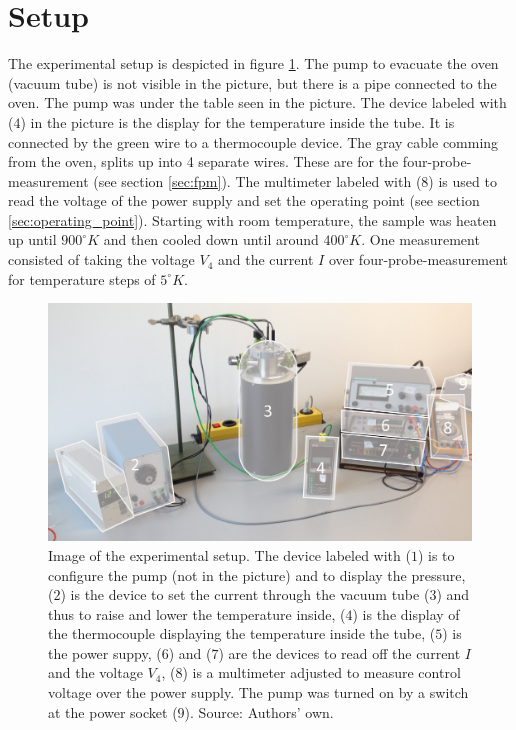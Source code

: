 \documentclass[a4paper]{article}
\begin{document}
\section{Setup}

The experimental setup is despicted in figure \ref{fig:setup}. The pump to evacuate the oven (vacuum tube) is not visible in the picture, but there is a pipe connected to the oven. The pump was under the table seen in the picture. The device labeled with ($4$) in the picture is the display for the temperature inside the tube. It is connected by the green wire to a thermocouple device. The gray cable comming from the oven, splits up into 4 separate wires. These are for the four-probe-measurement (see section \ref{sec:fpm}). The multimeter labeled with ($8$) is used to read the voltage of the power supply and set the operating point (see section \ref{sec:operating_point}). Starting with room temperature, the sample was heaten up until $900^{\circ}K$ and then cooled down until around $400^{\circ}K$. One measurement consisted of taking the voltage $V_4$ and the current $I$ over four-probe-measurement for temperature steps of $5^{\circ}K$.

\begin{figure}[H]
\captionsetup{singlelinecheck=off}
\centering
\includegraphics[width=1.0\textwidth]{img/setup.jpg}
\caption[blubb]{Image of the experimental setup. The device labeled with ($1$) is to configure the pump (not in the picture) and to display the pressure, ($2$) is the device to set the current through the vacuum tube ($3$) and thus to raise and lower the temperature inside, ($4$) is the display of the thermocouple displaying the temperature inside the tube, ($5$) is the power suppy, ($6$) and ($7$) are the devices to read off the current $I$ and the voltage $V_4$, ($8$) is a multimeter adjusted to measure control voltage over the power supply. The pump was turned on by a switch at the power socket ($9$). Source: Authors' own.}
\label{fig:setup}
\end{figure}
\end{document}
